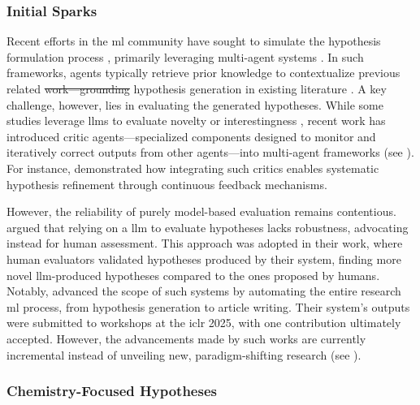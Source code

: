 \documentclass[11pt, oneside]{article}
\makeatletter
\providecommand{\DIFaddtex}[1]{{\protect\color{blue}\uwave{#1}}} %
\providecommand{\DIFdeltex}[1]{{\protect\color{red}\sout{#1}}} %
\providecommand{\DIFaddbegin}{} %
\providecommand{\DIFaddend}{} %
\providecommand{\DIFdelbegin}{} %
\providecommand{\DIFdelend}{} %
\providecommand{\DIFadd}[1]{\texorpdfstring{\DIFaddtex{#1}}{#1}} %
\providecommand{\DIFdel}[1]{\texorpdfstring{\DIFdeltex{#1}}{}} %
\newcommand{\DIFscaledelfig}{0.5}
\newlength{\DIFdelgraphicswidth} %
\newlength{\DIFdelgraphicsheight} %
\newcommand{\DIFaddincludegraphics}[2][]{{\color{blue}\fbox{\DIFOincludegraphics[#1]{#2}}}} %
\newcommand{\DIFdelincludegraphics}[2][]{%
\sbox{\DIFdelgraphicsbox}{\DIFOincludegraphics[#1]{#2}}%
\settoboxwidth{\DIFdelgraphicswidth}{\DIFdelgraphicsbox} %
\settoboxtotalheight{\DIFdelgraphicsheight}{\DIFdelgraphicsbox} %
\scalebox{\DIFscaledelfig}{%
\parbox[b]{\DIFdelgraphicswidth}{\usebox{\DIFdelgraphicsbox}\\[-\baselineskip] \rule{\DIFdelgraphicswidth}{0em}}\llap{\resizebox{\DIFdelgraphicswidth}{\DIFdelgraphicsheight}{%
\setlength{\unitlength}{\DIFdelgraphicswidth}%
\begin{picture}(1,1)%
\thicklines\linethickness{2pt} %
{\color[rgb]{1,0,0}\put(0,0){\framebox(1,1){}}}%
{\color[rgb]{1,0,0}\put(0,0){\line( 1,1){1}}}%
{\color[rgb]{1,0,0}\put(0,1){\line(1,-1){1}}}%
\end{picture}%
}\hspace*{3pt}}} %
} %
\DeclareRobustCommand{\DIFaddbegin}{\DIFOaddbegin \let\includegraphics\DIFaddincludegraphics} %
\DeclareRobustCommand{\DIFaddend}{\DIFOaddend \let\includegraphics\DIFOincludegraphics} %
\DeclareRobustCommand{\DIFdelbegin}{\DIFOdelbegin \let\includegraphics\DIFdelincludegraphics} %
\DeclareRobustCommand{\DIFdelend}{\DIFOaddend \let\includegraphics\DIFOincludegraphics} %
\let\sout@orig\sout %
\renewcommand{\sout}[1]{\ifmmode\text{\sout@orig{\ensuremath{#1}}}\else\sout@orig{#1}\fi} %
\makeatother
\begin{document}
\subsubsection{Initial Sparks}

Recent efforts in the \gls{ml} community have sought to simulate the hypothesis formulation process \autocite{Gu2025forecasting, arlt2024meta0designing}, primarily leveraging multi-agent systems \autocite{jansen2025codescientist0, kumbhar2025hypothesis}. 
In such frameworks, agents typically retrieve prior knowledge to contextualize previous related \DIFdelbegin \DIFdel{work---grounding }\DIFdelend \DIFaddbegin \DIFadd{work, grounding }\DIFaddend hypothesis generation in existing literature \autocite{naumov2025dora, ghareeb2025robin0, gu2024interesting}. 
A key challenge, however, lies in evaluating the generated hypotheses. 
While some studies leverage \glspl{llm} to evaluate novelty or interestingness \autocite{zhang2024omni0}, recent work has introduced critic agents---specialized components designed to monitor and iteratively correct outputs from other agents---into multi-agent frameworks (see ). 
For instance, \textcite{Ghafarollahi2024} demonstrated how integrating such critics enables systematic hypothesis refinement through continuous feedback mechanisms.

However, the reliability of purely model-based evaluation remains contentious. 
\textcite{si2025llms} argued that relying on a \DIFdelbegin %
\DIFdelend \DIFaddbegin \gls{llm} \DIFaddend to evaluate hypotheses lacks robustness, advocating instead for human assessment. 
This approach was adopted in their work, where human evaluators validated hypotheses produced by their system, finding more novel \gls{llm}-produced hypotheses compared to the ones proposed by humans.
Notably, \textcite{yamada2025ai} advanced the scope of such systems by automating the entire research \gls{ml} process, from hypothesis generation to article writing. 
Their system’s outputs were submitted to workshops at the \gls{iclr} 2025, with one contribution ultimately accepted. However, the advancements made by such works are currently incremental instead of unveiling new, paradigm-shifting research (see ).

\subsubsection{Chemistry-Focused Hypotheses}
\end{document}
